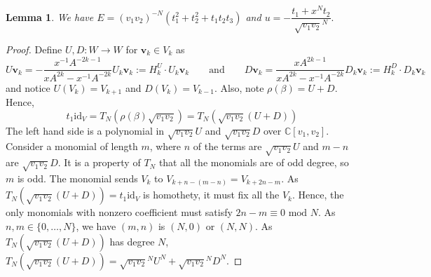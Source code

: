 \documentclass{article}
\newcommand{\C}{\mathbb{C}}
\newcommand{\id}{\text{id}}
\renewcommand{\v}{\mathbf{v}}
\newtheorem{lemma}[theorem]{Lemma}
\theoremstyle{definition}
\begin{document}
\begin{lemma}\label{lem:calculate-u}
	We have $E=(v_1v_2)^{-N}(t_1^2 +t_2^2 +t_1t_2t_3)$ and $u=-\dfrac{t_1+x^Nt_2}{\sqrt{v_1v_2}^N}.$
\end{lemma}
\begin{proof}
    Define $U,D:W\to W$ for $\v_k\in V_k$ as
\[        U\v_k=-\frac{x^{-1}A^{-2k-1}}{xA^{2k}-x^{-1}A^{-2k}}U_k\v_k:=H^U_k\cdot U_k\v_k
\qquad \text{and}\qquad
        D\v_k=\frac{xA^{2k-1}}{xA^{2k}-x^{-1}A^{-2k}}D_k\v_k:=H_k^D\cdot D_k\v_k
 \]
    and notice $U(V_k)=V_{k+1}$ and $D(V_k)=V_{k-1}$. Also, note $\rho(\beta)=U+D$. Hence,
    \[
    t_1\id_V=T_N(\rho(\beta)\sqrt{v_1v_2})=T_N(\sqrt{v_1v_2}(U+D))
    \]
    The left hand side is a polynomial in $\sqrt{v_1v_2}U$ and $\sqrt{v_1v_2}D$ over $\C[v_1,v_2]$. Consider a monomial of length $m$, where $n$ of the terms are $\sqrt{v_1v_2}U$ and $m-n$ are $\sqrt{v_1v_2}D$. It is a property of $T_N$ that all the monomials are of odd degree, so $m$ is odd. The monomial sends $V_k$ to $V_{k+n-(m-n)}=V_{k+2n-m}$. As $T_N(\sqrt{v_1v_2}(U+D))=t_1\id_V$ is homothety, it must fix all the $V_k$. Hence, the only monomials with nonzero coefficient must satisfy $2n-m\equiv 0\text{ mod }N$. As $n,m\in \{0,\ldots,N\}$, we have $(m,n)$ is $(N,0)$ or $(N,N)$. As $T_N(\sqrt{v_1v_2}(U+D))$ has degree $N$, $T_N(\sqrt{v_1v_2}(U+D))=\sqrt{v_1v_2}^{N}U^N+\sqrt{v_1v_2}^{N}D^N$. 
   

\end{proof}
\end{document}

